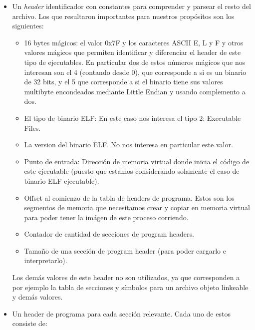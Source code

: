 \begin{itemize}
	\item Un \textit{header} identificador con constantes para comprender y parsear el resto del archivo. Los que
	resultaron importantes para nuestros prop\'ositos son los siguientes:

		\begin{itemize}
			\item 16 bytes m\'agicos: el valor 0x7F y los caracteres ASCII E, L y F y otros valores m\'agicos
			que permiten identificar y diferenciar el header de este tipo de ejecutables. En particular dos de estos
			n\'umeros m\'agicos que nos interesan son el 4 (contando desde 0), que corresponde a si es un binario de 32 bits,
			y el 5 que corresponde a si el binario tiene sus valores multibyte encondeados mediante Little Endian y usando
			complemento a dos.
			\item El tipo de binario ELF: En este caso nos interesa el tipo 2: Executable Files.
			\item La version del binario ELF. No nos interesa en particular este valor.
			\item Punto de entrada: Direcci\'on de memoria virtual donde inicia el c\'odigo de este ejecutable (puesto que
			estamos considerando solamente el caso de binario ELF ejecutable).
			\item Offset al comienzo de la tabla de headers de programa. Estos son los segmentos de memoria que necesitamos
			crear y copiar en memoria virtual para poder tener la im\'agen de este proceso corriendo.
			\item Contador de cantidad de secciones de program headers.
			\item Tama\~no de una secci\'on de program header (para poder cargarlo e interpretarlo).
		\end{itemize}
	
	Los dem\'as valores de este header no son utilizados, ya que corresponden a por ejemplo la tabla de secciones y s\'imbolos para
	un archivo objeto linkeable y dem\'as valores.

	\item Un header de programa para cada secci\'on relevante. Cada uno de estos consiste de:


\end{itemize}

